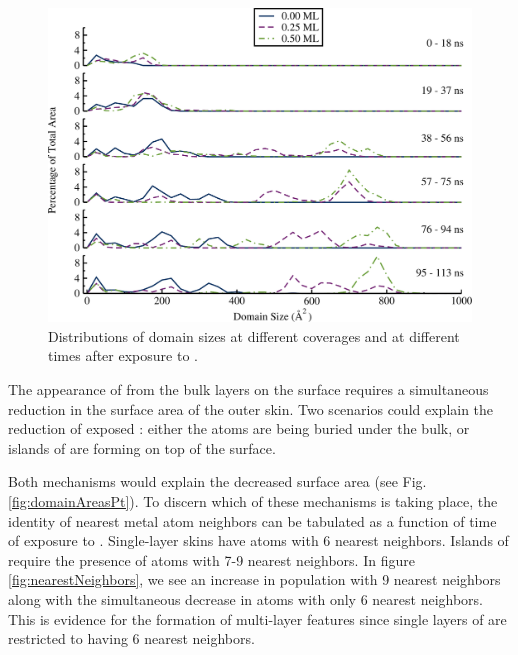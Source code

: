 \begin{figure}[p!]
\includegraphics[width=\linewidth]{../figures/chap3/domains_Pd_110ns.pdf}
\caption{Distributions of  domain sizes at different 
  coverages and at different times after exposure to .}
\label{fig:domainAreasPd} 
\end{figure}

The appearance of  from the bulk layers on the surface requires
a simultaneous reduction in the surface area of the outer 
skin. Two scenarios could explain the reduction of exposed :
either the  atoms are being buried under the  bulk, or
islands of  are forming on top of the  surface.

Both mechanisms would explain the decreased  surface area (see
Fig.  \ref{fig:domainAreasPt}).  To discern which of these mechanisms
is taking place, the identity of nearest metal atom neighbors can be
tabulated as a function of time of exposure to . Single-layer
 skins have atoms with 6  nearest neighbors. Islands of
 require the presence of  atoms with 7-9  nearest
neighbors. In figure \ref{fig:nearestNeighbors}, we see an increase in
 population with 9  nearest neighbors along with the
simultaneous decrease in  atoms with only 6  nearest
neighbors.  This is evidence for the formation of multi-layer 
features since single layers of  are restricted to having 6
 nearest neighbors.

